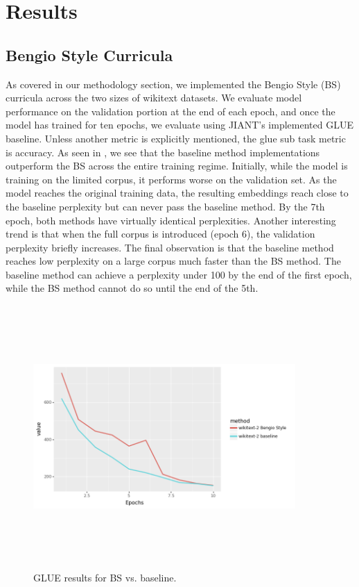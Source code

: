 \chapter{Results}
\label{chap:results}
\section{Bengio Style Curricula}
\label{chap:results:secBS}
As covered in our methodology section, we implemented the Bengio Style (BS) curricula across the two sizes of wikitext datasets. We evaluate model performance on the validation portion at the end of each epoch, and once the model has trained for ten epochs, we evaluate using JIANT's \cite{Pruksachatkun2020jiantAS} implemented GLUE baseline. Unless another metric is explicitly mentioned, the glue sub task metric is accuracy.
As seen in , we see that the baseline method implementations outperform the BS across the entire training regime. Initially, while the model is training on the limited corpus, it performs worse on the validation set. As the model reaches the original training data, the resulting embeddings reach close to the baseline perplexity but can never pass the baseline method. By the 7th epoch, both methods have virtually identical perplexities. Another interesting trend is that when the full corpus is introduced (epoch 6), the validation perplexity briefly increases. The final observation is that the baseline method reaches low perplexity on a large corpus much faster than the BS method. The baseline method can achieve a perplexity under 100 by the end of the first epoch, while the BS method cannot do so until the end of the 5th. \\
\begin{figure}[h]
\centering
\includegraphics[width=10cm, height=10cm]{Thesis/images/wikitext-2BS.png}
\caption{GLUE results for BS vs. baseline.}
\end{figure}
